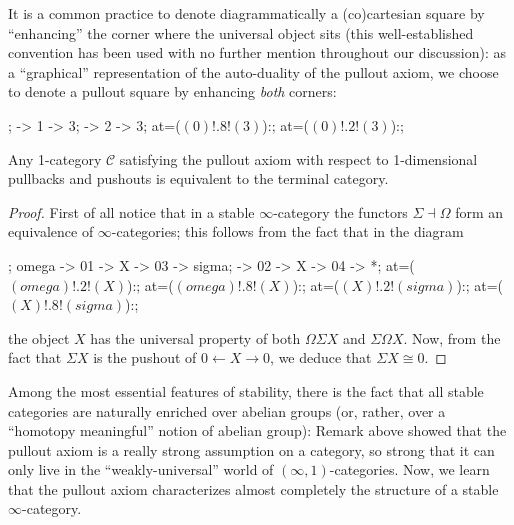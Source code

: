 \documentclass[11pt, a4paper]{amsart}
\newcommand{\pullback}[2]{\obj at=($(#1)!.2!(#2)$):{\lrcorner}}
\newcommand{\pushout}[2]{\obj  at=($(#1)!.8!(#2)$):{\ulcorner}}
\newcommand{\pullout}[2]{\pullback{#1}{#2}; \pushout{#1}{#2}}
\renewcommand{\C}{\mathcal{C}}
\begin{document}
\begin{notat}
It is a common practice to denote diagrammatically a (co)cartesian square by ``enhancing'' the corner where the universal object sits (this well-established convention has been used with no further mention throughout our discussion): as a ``graphical'' representation of the auto-duality of the pullout axiom, we choose to denote a pullout square by enhancing \emph{both} corners: 
\begin{center}
\begin{kD}
;
 -> 1 -> 3;
 -> 2 -> 3;
\pushout{0}{3};
\pullback{0}{3};
\end{kD}
\end{center}
\end{notat}
\begin{remark}\label{pullout.is.genuinely.higher}
Any 1-category $\C$ satisfying the pullout axiom with respect to 1-dimensional pullbacks and pushouts is equivalent to the terminal category.
\end{remark}
\begin{proof}
First of all notice that in a stable $\infty$-category the functors $\Sigma\dashv \Omega$ form an equivalence of $\infty$-categories; this follows from the fact that in the diagram
\begin{center}
\begin{kD}
;
\mor omega -> 01 -> X -> 03 -> sigma;
\mor * -> 02 -> X -> 04 -> *;
\pullout{omega}{X};
\pullout{X}{sigma};
\end{kD}
\end{center}
the object $X$ has the universal property of both $\Omega\Sigma X$ and $\Sigma\Omega X$. Now, from the fact that $\Sigma X$ is the pushout of $0\leftarrow X\to 0$, we deduce that $\Sigma X\cong 0$.
\end{proof}
Among the most essential features of stability, there is the fact that all stable categories are naturally enriched over abelian groups (or, rather, over a ``homotopy meaningful'' notion of abelian group): Remark  above showed that the pullout axiom is a really strong assumption on a category, so strong that it can only live in the ``weakly-universal'' world of $(\infty,1)$-categories. Now, we learn that the pullout axiom characterizes almost completely the structure of a stable $\infty$-category. 
\end{document}

